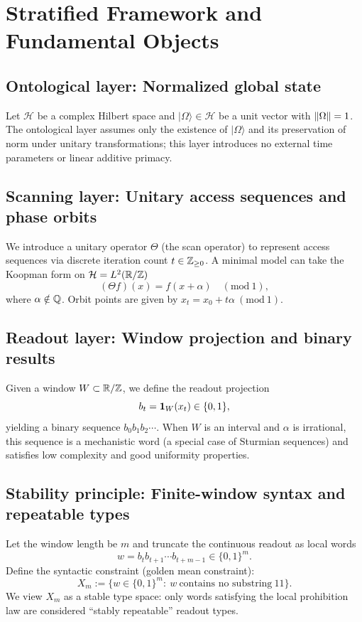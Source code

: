 \section{Stratified Framework and Fundamental Objects}

\subsection{Ontological layer: Normalized global state}

Let $\mathcal H$ be a complex Hilbert space and $\lvert\Omega\rangle\in\mathcal H$ be a unit vector with $\left\lVert \Omega\right\rVert=1$. The ontological layer assumes only the existence of $\lvert\Omega\rangle$ and its preservation of norm under unitary transformations; this layer introduces no external time parameters or linear additive primacy.

\subsection{Scanning layer: Unitary access sequences and phase orbits}

We introduce a unitary operator $\Theta$ (the scan operator) to represent access sequences via discrete iteration count $t\in\mathbb{Z}_{\ge 0}$. A minimal model can take the Koopman form on $\mathcal H=L^2(\mathbb{R}/\mathbb{Z})$
\[
(\Theta f)(x)=f(x+\alpha)\quad(\mathrm{mod}\ 1),
\]
where $\alpha\notin\mathbb{Q}$. Orbit points are given by $x_t=x_0+t\alpha\ (\mathrm{mod}\ 1)$.

\subsection{Readout layer: Window projection and binary results}

Given a window $W\subset\mathbb{R}/\mathbb{Z}$, we define the readout projection
\[
b_t=\mathbf{1}_W(x_t)\in\{0,1\},
\]
yielding a binary sequence $b_0b_1b_2\cdots$. When $W$ is an interval and $\alpha$ is irrational, this sequence is a mechanistic word (a special case of Sturmian sequences) and satisfies low complexity and good uniformity properties.

\subsection{Stability principle: Finite-window syntax and repeatable types}

Let the window length be $m$ and truncate the continuous readout as local words
\[
w=b_t b_{t+1}\cdots b_{t+m-1}\in\{0,1\}^m.
\]
Define the syntactic constraint (golden mean constraint):
\[
X_m:=\{w\in\{0,1\}^m:\ w\ \text{contains no substring}\ 11\}.
\]
We view $X_m$ as a stable type space: only words satisfying the local prohibition law are considered ``stably repeatable'' readout types.

